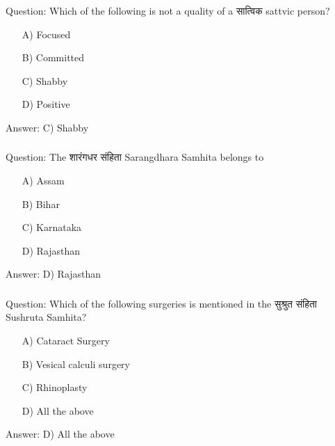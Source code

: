 \begin{frame}[fragile]\frametitle{}

Question: Which of the following is not a quality of a सात्विक  sattvic person?

\begin{itemize}
\item[A)] Focused
\item[B)] Committed
\item[C)] Shabby
\item[D)] Positive
\end{itemize}

Answer: C) Shabby
\end{frame}

\begin{frame}[fragile]\frametitle{}

Question: The शारंगधर संहिता Sarangdhara Samhita belongs to

\begin{itemize}
\item[A)] Assam
\item[B)] Bihar
\item[C)] Karnataka
\item[D)] Rajasthan
\end{itemize}

Answer: D) Rajasthan
\end{frame}

\begin{frame}[fragile]\frametitle{}

Question: Which of the following surgeries is mentioned in the सुश्रुत  संहिता Sushruta Samhita?

\begin{itemize}
\item[A)] Cataract Surgery
\item[B)] Vesical calculi surgery
\item[C)] Rhinoplasty
\item[D)] All the above
\end{itemize}

Answer: D) All the above
\end{frame}


